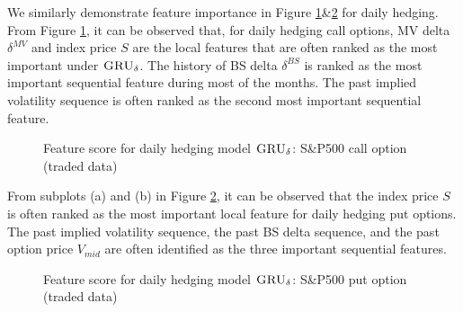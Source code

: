 \documentclass[letterpaper,12pt,titlepage,oneside,final]{book}
\numberwithin{equation}{section}
\theoremstyle{definition}
\newcommand{\model}{\textsc{GRU}_\delta}
\begin{document}
We similarly demonstrate feature importance in Figure \ref{fig:call1daily}\&\ref{fig:put1daily} for daily hedging.  From Figure \ref{fig:call1daily}, it can be observed that, for daily hedging call options, MV delta $\delta^{MV}$ and index price $S$ are the local features that are often ranked as the most important under $\model$. The history of BS delta $\delta^{BS}$ is ranked as the most important sequential feature during most of the months. The past implied volatility sequence is often ranked as the second most important sequential feature.
\begin{figure}[htp]
\centering
{}
\caption{Feature score for daily hedging model $\model$: S\&P500 call option (traded data)} \label{fig:call1daily}
\end{figure}

From subplots (a) and (b) in Figure \ref{fig:put1daily}, it can be observed that the index price $S$ is often ranked as the most important local feature for daily hedging put options. The past implied volatility sequence, the past  BS delta sequence, and the past option price $V_{mid}$  are often identified as the three important sequential features.
\begin{figure}[htp]
\centering
{}
\caption{Feature score for daily hedging model $\model$:  S\&P500 put option (traded data)} \label{fig:put1daily}
\end{figure}
\end{document}
